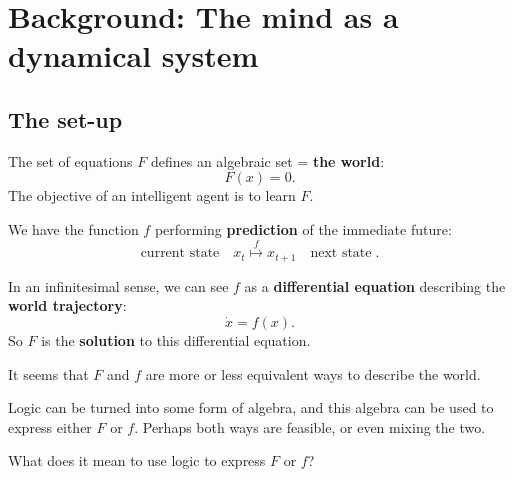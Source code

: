 \chapter{Background: The mind as a dynamical system}\label{chap:background1}

\section{The set-up}

The set of equations $F$ defines an algebraic set = \textbf{the world}:
\begin{equation}
F(x) = 0 .
\end{equation}
The objective of an intelligent agent is to learn $F$.

We have the function $f$ performing \textbf{prediction} of the immediate future:
\begin{equation}
\boxed{\mbox{current state}} \quad x_t \stackrel{f}{\mapsto} x_{t+1} \quad \boxed{\mbox{next state}} \;.
\end{equation}

In an infinitesimal sense, we can see $f$ as a \textbf{differential equation} describing the \textbf{world trajectory}:
\begin{equation}
\dot{x} = f(x) .
\end{equation}
So $F$ is the \textbf{solution} to this differential equation.

It seems that $F$ and $f$ are more or less equivalent ways to describe the world.

Logic can be turned into some form of algebra, and this algebra can be used to express either $F$ or $f$.  Perhaps both ways are feasible, or even mixing the two.

What does it mean to use logic to express $F$ or $f$?

